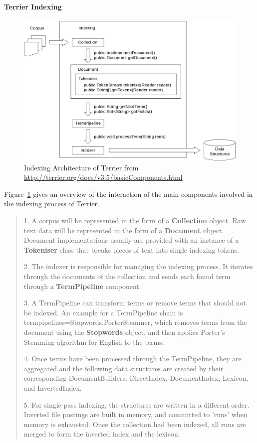 \paragraph{Terrier Indexing}
\begin{figure}
\centering
\includegraphics[scale=0.4]{./figures/terrierindexing.png}
\caption{Indexing Architecture of Terrier from \protect\url{http://terrier.org/docs/v3.5/basicComponents.html}} \label{fig:terrierindexing} 
\end{figure}

Figure~\ref{fig:terrierindexing} gives an overview of the interaction of the main components involved in the indexing process of Terrier.

\begin{quotation}
 \item 1. A corpus will be represented in the form of a \textbf{Collection} object. Raw text data will be represented in the form of a \textbf{Document} object. 
 Document implementations usually are provided with an instance of a \textbf{Tokeniser} class that breaks pieces of text into single indexing tokens.
 \item 2. The indexer is responsible for managing the indexing process. It iterates through the documents of the collection and sends each found 
 term through a \textbf{TermPipeline} component.
 \item 3. A TermPipeline can transform terms or remove terms that should not be indexed. An example for a TermPipeline chain is 
 termpipelines=Stopwords,PorterStemmer, which removes terms from the document using the \textbf{Stopwords} object, and then applies Porter's Stemming algorithm 
 for English to the terms.
 \item 4. Once terms have been processed through the TermPipeline, they are aggregated and the following data structures are created by their corresponding 
 DocumentBuilders: DirectIndex, DocumentIndex, Lexicon, and InvertedIndex.
 \item 5. For single-pass indexing, the structures are written in a different order. Inverted file postings are built in memory, and committed to 'runs' 
 when memory is exhausted. Once the collection had been indexed, all runs are merged to form the inverted index and the lexicon.
\end{quotation}

